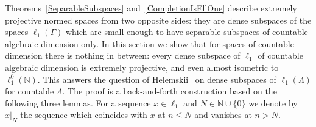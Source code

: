 \documentclass[12pt]{article}
\newcommand{\lo}[1]{\ell_1^0(#1)}
\newcommand{\ellone}[1]{\ell_1(#1)}
\begin{document}
Theorems~\ref{SeparableSubspaces}
and~\ref{CompletionIsEllOne} describe extremely projective normed spaces
from two opposite sides: they are dense subspaces of the spaces
$\ellone{\Gamma}$ which are small enough to have separable subspaces of
countable algebraic dimension only. In this section we show that for spaces of
countable dimension there is nothing in between: every dense subspace of
$\ell_1$ of countable algebraic dimension is extremely projective, and even
almost isometric to $\lo{\mathbb{N}}$. This answers the question of
Helemskii~\cite[section 2]{HelExtrProjSeqAlg} on dense subspaces of
$\ellone{\Lambda}$ for countable $\Lambda$. The proof is a back-and-forth
construction based on the following three lemmas. For a sequence
$x\in\ell_1$ and $N\in\mathbb{N}\cup\{0\}$ we denote by $x|_N$ the sequence
which coincides with $x$ at $n\leq N$ and vanishes at $n>N$.
\end{document}
